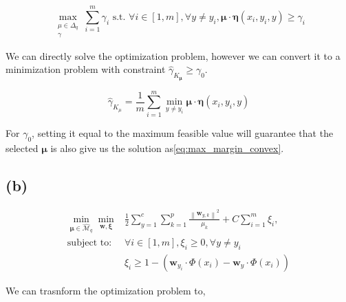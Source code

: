 \documentclass{article}
\begin{document}
\begin{equation}
    \max _{\substack{\mu \in \Delta_{q} \\ \gamma}} \sum_{i=1}^{m} \gamma_{i} \text { s.t. } \forall i \in[1, m], \forall y \neq y_{i}, \boldsymbol{\mu} \cdot \boldsymbol{\eta}\left(x_{i}, y_{i}, y\right) \geq \gamma_{i}
    \label{eq:max_margin_convex}
\end{equation}


We can directly solve the optimization problem, however we can convert it to a minimization problem with constraint $\widehat{\gamma}_{K_{\boldsymbol{\mu}}} \geq \gamma_{0}$.

\begin{equation}
    \widehat{\gamma}_{K_{\mu}}=\frac{1}{m} \sum_{i=1}^{m} \min _{y \neq y_{i}} \boldsymbol{\mu} \cdot \boldsymbol{\eta}\left(x_{i}, y_{i}, y\right)
\end{equation}

For $\gamma_0$, setting it equal to the maximum feasible value will guarantee that the selected $\bm{\mu}$ is also give us the solution as\eqref{eq:max_margin_convex}.

\subsection*{(b)}

\begin{equation}
    \begin{aligned}
        \min _{\boldsymbol{\mu} \in \widehat{\mathcal{M}}_{q}} \min _{\mathbf{w}, \boldsymbol{\xi}} & \frac{1}{2} \sum_{y=1}^{c} \sum_{k=1}^{p} \frac{\left\|\mathbf{w}_{y, k}\right\|^{2}}{\mu_{k}}+C \sum_{i=1}^{m} \xi_{i}, \\
        \text{subject to: }                                                                         & \forall i \in[1, m], \xi_{i} \geq 0, \forall y \neq y_{i}                                                                \\
                                                                                                    & \xi_{i} \geq 1-\left(\mathbf{w}_{y_{i}} \cdot \Phi\left(x_{i}\right)-\mathbf{w}_{y} \cdot \Phi\left(x_{i}\right)\right)
    \end{aligned}
\end{equation}

We can trasnform the optimization problem to,
\end{document}
